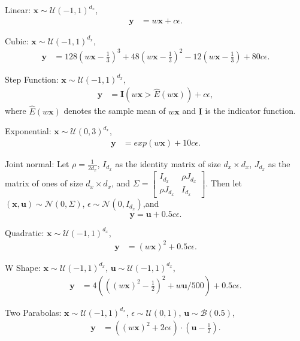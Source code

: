 \documentclass[11pt]{article}
\providecommand{\mb}[1]{\boldsymbol{#1}}
\providecommand{\mc}[1]{\mathcal{#1}}
\begin{document}
\setcounter{equation}{0}
\begin{compactenum}
\item Linear: $\mb{x} \sim \mc{U}(-1,1)^{d_{x}}$, 
\begin{align*}
\mb{y} &=w\mb{x}+c\epsilon.
\end{align*}
\item Cubic: $\mb{x} \sim \mc{U}(-1,1)^{d_{x}}$, 
\begin{align*}
\mb{y} &=128(w\mb{x}-\frac{1}{3})^3+48(w\mb{x}-\frac{1}{3})^2-12(w\mb{x}-\frac{1}{3})+80c\epsilon.
\end{align*}
\item Step Function: $\mb{x} \sim \mc{U}(-1,1)^{d_{x}}$, 
\begin{align*}
\mb{y} &=\mb{I}(w\mb{x}>\hat{E}(w\mb{x}))+c\epsilon,
\end{align*}
where $\hat{E}(w\mb{x})$ denotes the sample mean of $w\mb{x}$ and $\mb{I}$ is the indicator function. 
\item Exponential: $\mb{x} \sim \mc{U}(0,3)^{d_{x}}$, 
\begin{align*}
\mb{y} &=exp(w\mb{x})+10c\epsilon.
\end{align*}
\item Joint normal: Let $\rho=\frac{1}{2d_{x}}$, $I_{d_{x}}$ as the identity matrix of size $d_{x} \times d_{x}$, $J_{d_{x}}$ as the matrix of ones of size $d_{x} \times d_{x}$, and $\Sigma = \begin{bmatrix} I_{d_{x}}&\rho J_{d_{x}}\\ \rho J_{d_{x}}&I_{d_{x}} \end{bmatrix}$. Then let $(\mb{x},\mb{u}) \sim \mc{N}(0, \Sigma)$, $\epsilon \sim \mc{N}(0, I_{d_{x}})$,and $$\mb{y}=\mb{u}+0.5c\epsilon.$$ 
\item Quadratic: $\mb{x} \sim \mc{U}(-1,1)^{d_{x}}$,
\begin{align*}
\mb{y}&=(w\mb{x})^2+0.5c\epsilon.
\end{align*}
\item W Shape: $\mb{x} \sim \mc{U}(-1,1)^{d_{x}}$, $\mb{u} \sim \mc{U}(-1,1)^{d_{x}}$,
\begin{align*}
\mb{y}&=4( ( (w\mb{x})^2 - \frac{1}{2} )^2 + w\mb{u}/500 )+0.5c\epsilon.
\end{align*}
\item Two Parabolas: $\mb{x} \sim \mc{U}(-1,1)^{d_{x}}$, $\epsilon \sim \mc{U}(0,1)$, $\mb{u} \sim \mc{B}(0.5)$,
\begin{align*}
\mb{y}&=( (w\mb{x})^2  + 2c\epsilon) \cdot (\mb{u}-\frac{1}{2}).
\end{align*}

\end{compactenum}
\end{document}
